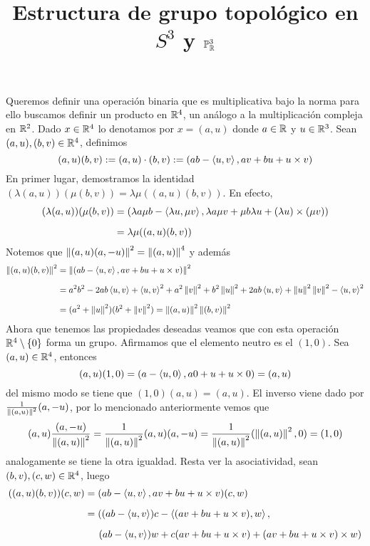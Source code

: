 \documentclass{article}
\title{Estructura de grupo topológico en $S^{3}$ y $\mathbb{P}^{3}_{\mathbb{R}}$}
\author{}
\date{}
\begin{document}
\maketitle

\noindent Queremos definir una operación binaria que es multiplicativa bajo la norma para ello 
buscamos definir un producto en $\mathbb{R}^{4}$, un análogo a la multiplicación compleja en $\mathbb{R}^{2}$. 
Dado $x\in\mathbb{R}^{4}$ lo denotamos por $x=(a,u)$ donde $a\in\mathbb{R}$ y $u\in\mathbb{R}^{3}$. Sean 
$(a,u),(b,v)\in\mathbb{R}^{4}$, definimos
\begin{equation*}
    (a,u)(b,v):=(a,u)\cdot(b,v):=(ab-\left\langle{u},{v}\right\rangle,av+bu+u\times v)
\end{equation*}
En primer lugar, demostramos la identidad $(\lambda(a,u))(\mu(b,v))=\lambda\mu((a,u)(b,v))$.
En efecto,
\begin{align*}
    (\lambda(a,u))(\mu(b,v)) &= (\lambda a\mu b-\left\langle{\lambda u},{\mu v}\right\rangle,\lambda a\mu v
    +\mu b\lambda u+(\lambda u)\times(\mu v)) \\[2mm]
    &= \lambda\mu((a,u)(b,v))
\end{align*}
Notemos que $\left \lVert (a,u)(a,-u)\right \rVert^{2}=\left \lVert (a,u)\right \rVert^{4}$ y además
\begin{align*}
    \left \lVert (a,u)(b,v)\right \rVert^{2} &= \left \lVert (ab-\left\langle{u},{v}\right\rangle,av+bu+u\times v)\right \rVert^{2} \\[2mm]
    &= a^{2}b^{2}-2ab\left\langle{u},{v}\right\rangle+\left\langle{u},{v}\right\rangle^{2}+a^{2}\left \lVert v\right \rVert^{2}+b^{2}\left \lVert u\right \rVert^{2}+2ab\left\langle{u},{v}\right\rangle
    +\left \lVert u\right \rVert^{2}\left \lVert v\right \rVert^{2}-\left\langle{u},{v}\right\rangle^{2} \\[2mm]
    &= (a^{2}+\left \lVert u\right \rVert^{2})(b^{2}+\left \lVert v\right \rVert^{2})=\left \lVert (a,u)\right \rVert^{2}\left \lVert (b,v)\right \rVert^{2}
\end{align*}
Ahora que tenemos las propiedades deseadas veamos que con esta operación $\mathbb{R}^{4}\setminus\{0\}$
forma un grupo. Afirmamos que el elemento neutro es el $(1,0)$. Sea 
$(a,u)\in\mathbb{R}^{4}$, entonces
\begin{equation*}
    (a,u)(1,0)=(a-\left\langle{u},{0}\right\rangle,a0+u+u\times0)=(a,u)
\end{equation*}
del mismo modo se tiene que $(1,0)(a,u)=(a,u)$. El inverso viene dado por 
$\frac{1}{\left \lVert (a,u)\right \rVert^{2}}(a,-u)$, por lo mencionado anteriormente vemos que
\begin{equation*}
    (a,u)\frac{(a,-u)}{\left \lVert (a,u)\right \rVert^{2}}=\frac{1}{\left \lVert (a,u)\right \rVert^{2}}(a,u)(a,-u)
    =\frac{1}{\left \lVert (a,u)\right \rVert^{2}}(\left \lVert (a,u)\right \rVert^{2},0)=(1,0)
\end{equation*}
analogamente se tiene la otra igualdad. Resta ver la asociatividad, sean $(b,v),(c,w)\in\mathbb{R}^{4}$, 
luego
\begin{align*}
    ((a,u)(b,v))(c,w) &= (ab-\left\langle{u},{v}\right\rangle,av+bu+u\times v)(c,w) \\[2mm]
    &= ((ab-\left\langle{u},{v}\right\rangle)c-\left\langle{(av+bu+u\times v)},{w}\right\rangle, \\[2mm]
    &\hspace{5mm}(ab-\left\langle{u},{v}\right\rangle)w+c(av+bu+u\times v)+(av+bu+u\times v)\times w)
\end{align*}
\end{document}
